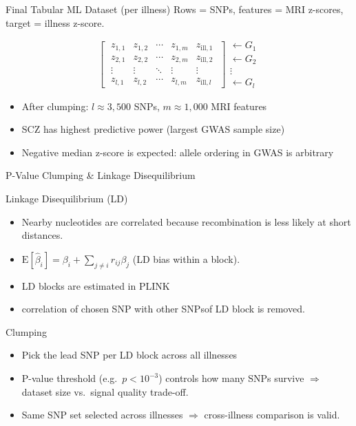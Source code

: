 \documentclass[aspectratio=169, 10pt]{beamer}
\begin{document}
\begin{frame}{Final Tabular ML Dataset (per illness)}
Rows = SNPs, features = MRI z-scores, target = illness z-score.

\[
\left[\;
\begin{array}{cccc|c}
z_{1,1} & z_{1,2} & \cdots & z_{1,m} & z_{\text{ill},1}\\
z_{2,1} & z_{2,2} & \cdots & z_{2,m} & z_{\text{ill},2}\\
\vdots  & \vdots  & \ddots & \vdots  & \vdots\\
z_{l,1} & z_{l,2} & \cdots & z_{l,m} & z_{\text{ill},l}
\end{array}
\;\right]
\begin{array}{l}
\leftarrow G_1\\
\leftarrow G_2\\
\vdots\\
\leftarrow G_l
\end{array}
\]

\begin{itemize}
    \item After clumping: $l \approx 3{,}500$ SNPs, $m \approx 1{,}000$ MRI features
    \item SCZ has highest predictive power (largest GWAS sample size)
    \item Negative median z-score is expected: allele ordering in GWAS is arbitrary
\end{itemize}
\end{frame}


\begin{frame}{P-Value Clumping \& Linkage Disequilibrium}
\begin{block}{Linkage Disequilibrium (LD)}
\begin{itemize}\setlength\itemsep{3pt}
    \item Nearby nucleotides are correlated because recombination is less likely at short distances.
    \item $\mathrm{E}[\hat\beta_i] = \beta_i + \sum_{j\neq i} r_{ij}\beta_j$ (LD bias within a block).
    \item LD blocks are estimated in \textsc{PLINK} 
    \item correlation of chosen SNP with other SNPsof LD block is removed.
\end{itemize}
\end{block}

\begin{block}{Clumping}
\begin{itemize}\setlength\itemsep{3pt}
    \item Pick the lead SNP per LD block across all illnesses
    \item P-value threshold (e.g.\ $p < 10^{-3}$) controls how many SNPs survive 
    \newline $\Rightarrow$ dataset size vs.\ signal quality trade-off.
    \item Same SNP set selected across illnesses \newline $\Rightarrow$ cross-illness comparison is valid.
\end{itemize}
\end{block}
\end{frame}
\end{document}
